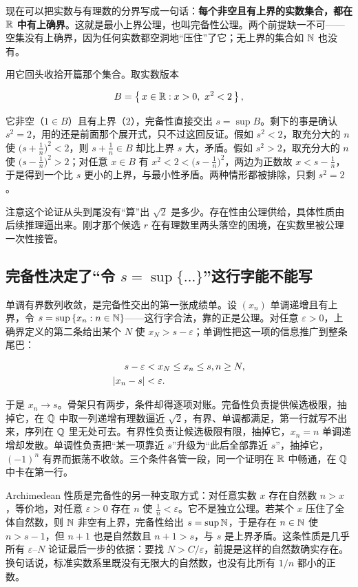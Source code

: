 现在可以把实数与有理数的分界写成一句话：\textbf{每个非空且有上界的实数集合，都在 \(\mathbb{R}\) 中有上确界}。这就是最小上界公理，也叫完备性公理。两个前提缺一不可——空集没有上确界，因为任何实数都空洞地``压住''了它；无上界的集合如 \(\mathbb{N}\) 也没有。

用它回头收拾开篇那个集合。取实数版本

\[
B=\set{\,x\in\R:x>0,\ x^2<2\,},
\]

它非空（\(1\in B\)）且有上界（\(2\)），完备性直接交出 \(s=\sup B\)。剩下的事是确认 \(s^2=2\)，用的还是前面那个展开式，只不过这回反证。假如 \(s^2<2\)，取充分大的 \(n\) 使 \(\big(s+\frac1n\big)^2<2\)，则 \(s+\frac1n\in B\) 却比上界 \(s\) 大，矛盾。假如 \(s^2>2\)，取充分大的 \(n\) 使 \(\big(s-\frac1n\big)^2>2\)；对任意 \(x\in B\) 有 \(x^2<2<\big(s-\frac1n\big)^2\)，两边为正数故 \(x<s-\frac1n\)，于是得到一个比 \(s\) 更小的上界，与最小性矛盾。两种情形都被排除，只剩 \(s^2=2\)。

注意这个论证从头到尾没有``算''出 \(\sqrt2\) 是多少。存在性由公理供给，具体性质由后续推理逼出来。刚才那个候选 \(r\) 在有理数里两头落空的困境，在实数里被公理一次性接管。

\subsection{完备性决定了``令 \(s=\sup\{\dots\}\)''这行字能不能写}

单调有界数列收敛，是完备性交出的第一张成绩单。设 \((x_n)\) 单调递增且有上界，令 \(s=\sup\left\{x_n:n\in\mathbb{N}\right\}\)——这行字合法，靠的正是公理。对任意 \(\varepsilon>0\)，上确界定义的第二条给出某个 \(N\) 使 \(x_N>s-\varepsilon\)；单调性把这一项的信息推广到整条尾巴：

\[
\begin{aligned}
s-\varepsilon &< x_N \le x_n \le s, \space n\ge N,\\
\left|x_n-s\right| &< \varepsilon.
\end{aligned}
\]

于是 \(x_n\to s\)。骨架只有两步，条件却得逐项对账。完备性负责提供候选极限，抽掉它，在 \(\mathbb{Q}\) 中取一列递增有理数逼近 \(\sqrt2\)，有界、单调都满足，第一行就写不出来，序列在 \(\mathbb{Q}\) 里无处可去。有界性负责让候选极限有限，抽掉它，\(x_n=n\) 单调递增却发散。单调性负责把``某一项靠近 \(s\)''升级为``此后全部靠近 \(s\)''，抽掉它，\((-1)^n\) 有界而振荡不收敛。三个条件各管一段，同一个证明在 \(\mathbb{R}\) 中畅通，在 \(\mathbb{Q}\) 中卡在第一行。

Archimedean 性质是完备性的另一种支取方式：对任意实数 \(x\) 存在自然数 \(n>x\)，等价地，对任意 \(\varepsilon>0\) 存在 \(n\) 使 \(\frac1n<\varepsilon\)。它不是独立公理。若某个 \(x\) 压住了全体自然数，则 \(\mathbb{N}\) 非空有上界，完备性给出 \(s=\sup\mathbb{N}\)，于是存在 \(n\in\mathbb{N}\) 使 \(n>s-1\)，但 \(n+1\) 也是自然数且 \(n+1>s\)，与 \(s\) 是上界矛盾。这条性质是几乎所有 \(\varepsilon\)--\(N\) 论证最后一步的依据：要找 \(N>C/\varepsilon\)，前提是这样的自然数确实存在。换句话说，标准实数系里既没有无限大的自然数，也没有比所有 \(1/n\) 都小的正数。

